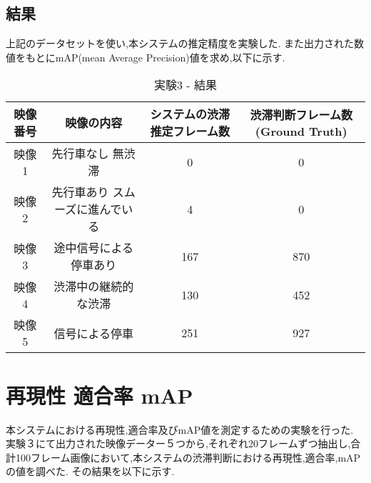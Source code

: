 \subsection{結果}
上記のデータセットを使い,本システムの推定精度を実験した.
また出力された数値をもとにmAP(mean Average Precision)値を求め,以下に示す.

\begin{table}[htbp]
  \centering
  \begin{scriptsize}
  \begin{tabular}{cccc}
  \toprule
映像番号 & 映像の内容 & システムの渋滞推定フレーム数 & 渋滞判断フレーム数(Ground Truth)\\
  \midrule
映像1 & 先行車なし 無渋滞 & 0 & 0 \\
映像2 & 先行車あり スムーズに進んでいる & 4 & 0 \\
映像3 & 途中信号による停車あり & 167 & 870\\
映像4 & 渋滞中の継続的な渋滞 & 130 & 452\\
映像5 & 信号による停車 & 251 & 927 \\
\bottomrule
\end{tabular}
\end{scriptsize}
  \caption{実験3 - 結果}
  \label{tab:exp3_fig}
\end{table}

\section{再現性 適合率 mAP}
本システムにおける再現性,適合率及びmAP値を測定するための実験を行った.
実験３にて出力された映像データー５つから,それぞれ20フレームずつ抽出し,合計100フレーム画像において,本システムの渋滞判断における再現性,適合率,mAPの値を調べた.
その結果を以下に示す.
